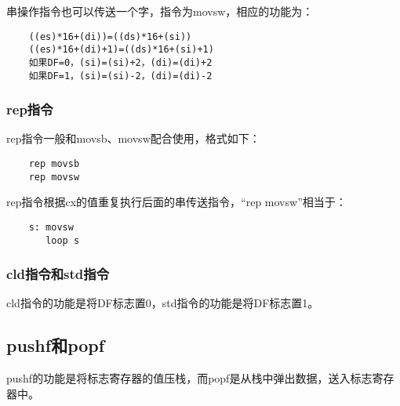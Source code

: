 \documentclass[a4paper,left=2.5cm,right=2.5cm,11pt]{article}
\begin{document}
	串操作指令也可以传送一个字，指令为movsw，相应的功能为：
	\begin{lstlisting}
	((es)*16+(di))=((ds)*16+(si))
	((es)*16+(di)+1)=((ds)*16+(si)+1)
	如果DF=0，(si)=(si)+2，(di)=(di)+2
	如果DF=1，(si)=(si)-2，(di)=(di)-2
	\end{lstlisting}

\subsubsection{rep指令}
	rep指令一般和movsb、movsw配合使用，格式如下：
	\begin{lstlisting}
	rep movsb
	rep movsw
	\end{lstlisting}

	rep指令根据cx的值重复执行后面的串传送指令，“rep movsw”相当于：
	\begin{lstlisting}
	s: movsw
	   loop s
	\end{lstlisting}

\subsubsection{cld指令和std指令}
	cld指令的功能是将DF标志置0，std指令的功能是将DF标志置1。

\subsection{pushf和popf}
	pushf的功能是将标志寄存器的值压栈，而popf是从栈中弹出数据，送入标志寄存器中。
\end{document}

